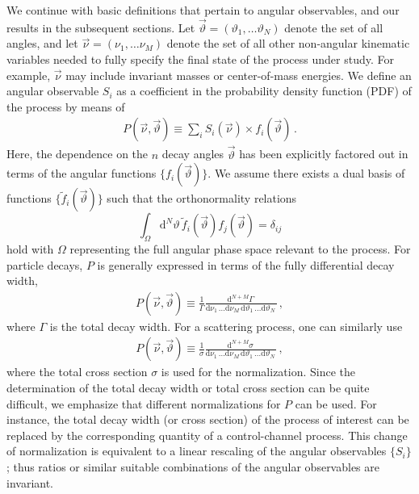 \documentclass[aps,prd,reprint,nofootinbib,preprintnumbers]{revtex4}
\newcommand{\dual}[1]{\tilde{#1}}
\newcommand{\nuvec}{\vec{\nu}}
\newcommand{\rmdx}[1]{\mbox{d} #1 \,} %
\newcommand{\thvec}{\vec{\vartheta}}
\renewcommand{\theta}{\vartheta}
\begin{document}
We continue with basic definitions that pertain to angular observables, and our
results in the subsequent sections. Let $\thvec = (\theta_1, \dots \theta_N)$ denote the set of all
angles, and let $\nuvec = (\nu_1, \dots \nu_M)$ denote the set of all
other non-angular kinematic variables needed to fully specify the
final state of the process under study. For example, $\nuvec$ may
include invariant masses or center-of-mass energies. We define an
angular observable $S_i$ as a coefficient in the probability density
function (PDF) of the process by means of
\begin{align}
    \label{eq:def-P}
    P(\nuvec, \thvec) \equiv \sum_i S_i(\nuvec) \times f_i(\thvec)\,.
\end{align}
Here, the dependence on the $n$ decay angles $\thvec$ has been
explicitly factored out in terms of the angular functions
$\{f_i(\thvec)\}$. We assume there exists a dual basis of functions
$\{\dual{f}_i(\thvec)\}$ such that the orthonormality relations
\begin{equation}
    \label{eq:def-ortho-rel}
    \int_\Omega \rmdx{^N \theta} \dual{f}_i(\thvec) f_j(\thvec)  = \delta_{ij}
\end{equation}
hold with $\Omega$ representing the full angular phase space relevant
to the process.  For particle decays, $P$ is generally expressed in
terms of the fully differential decay width,
\begin{align}
    \label{eq:def-P-decay}
    P(\nuvec, \thvec) \equiv \frac{1}{\Gamma}\frac{\rmdx{^{N+M}\Gamma}}{\rmdx{\nu_1} \dots \rmdx{\nu_M} \rmdx{\theta_1} \dots \rmdx{\theta_N}}\,,
\end{align}
where $\Gamma$ is the total decay width. For a scattering process, one can similarly use
\begin{align}
    \label{eq:def-P-scattering}
    P(\nuvec, \thvec) \equiv \frac{1}{\sigma}\frac{\rmdx{^{N+M}\sigma}}{\rmdx{\nu_1} \dots \rmdx{\nu_M} \rmdx{\theta_1} \dots \rmdx{\theta_N}}\,,
\end{align}
where the total cross section $\sigma$ is used for the
normalization. Since the determination of the total decay width or
total cross section can be quite difficult, we emphasize that
different normalizations for $P$ can be used.  For instance, the total
decay width (or cross section) of the process of interest can be
replaced by the corresponding quantity of a control-channel
process. This change of normalization is equivalent to a linear rescaling of
the angular observables $\lbrace S_i\rbrace$; thus ratios or similar suitable combinations
of the angular observables are invariant.\\
\end{document}
